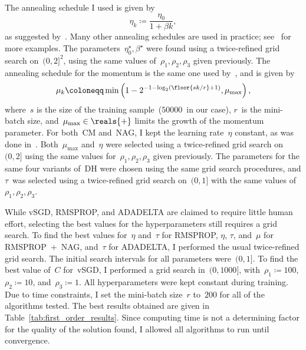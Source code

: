 \documentclass[11pt,a4paper]{article}
\numberwithin{equation}{section}
\begin{document}
The annealing schedule I used is given by
\[
	\eta_k \coloneqq \frac{\eta_0}{1 + \beta k},
\]
as suggested by~\citep{bottou2012stochastic}. Many other annealing schedules are
used in practice; see~\citet{pylearn2-training} for more examples. The
parameters~$\eta_0^\star, \beta^\star$ were found using a twice-refined grid
search on~$(0, 2]^2$, using the same values of~$\rho_1, \rho_2, \rho_3$ given
previously. The annealing schedule for the momentum is the same one used
by~\citet{sutskever2013importance}, and is given by
\[
	\mu_k \coloneqq \min\left(
		1 - 2^{-1 - \log_2(\floor{sk / r} + 1)},
	\mu_{\text{max}}\right),
\]
where~$s$ is the size of the training sample~($\num{50000}$~in our case), $r$~is
the mini-batch size, and~$\mu_{\text{max}} \in \reals{+}$ limits the growth of
the momentum parameter. For both~CM and~NAG, I kept the learning rate~$\eta$
constant, as was done in~\citet{sutskever2013importance}.
Both~$\mu_{\text{max}}$ and~$\eta$ were selected using a twice-refined grid
search on~$(0, 2]$ using the same values for~$\rho_1, \rho_2, \rho_3$ given
previously. The parameters for the same four variants of~DH were chosen using
the same grid search procedures, and $\tau$~was selected using a twice-refined
grid search on~$(0, 1]$ with the same values of~$\rho_1, \rho_2, \rho_3$.

While vSGD, RMSPROP, and ADADELTA are claimed to require little human effort,
selecting the best values for the hyperparameters still requires a grid search.
To find the best values for~$\eta$ and~$\tau$ for RMSPROP, $\eta$, $\tau$,
and~$\mu$ for RMSPROP~+~NAG, and~$\tau$ for ADADELTA, I performed the usual
twice-refined grid search. The initial search intervals for all parameters
were~$(0, 1]$. To find the best value of~$C$ for~vSGD, I performed a grid search
in~$(0, \num{1000}]$, with~$\rho_1 \coloneqq 100$, $\rho_2 \coloneqq 10$,
and~$\rho_3 \coloneqq 1$. All hyperparameters were kept constant during
training. Due to time constraints, I set the mini-batch size~$r$ to~$200$ for
all of the algorithms tested. The best results obtained are given in
Table~\ref{tab:first_order_results}. Since computing time is not a determining
factor for the quality of the solution found, I allowed all algorithms to run
until convergence.
\end{document}
